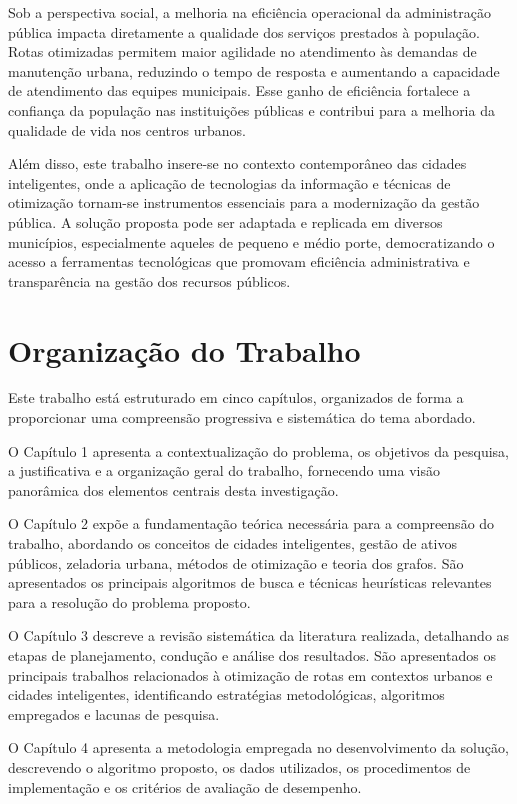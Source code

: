 Sob a perspectiva social, a melhoria na eficiência operacional da administração pública impacta 
diretamente a qualidade dos serviços prestados à população. Rotas otimizadas permitem maior agilidade 
no atendimento às demandas de manutenção urbana, reduzindo o tempo de resposta e aumentando a 
capacidade de atendimento das equipes municipais. Esse ganho de eficiência fortalece a confiança 
da população nas instituições públicas e contribui para a melhoria da qualidade de vida nos centros urbanos.

Além disso, este trabalho insere-se no contexto contemporâneo das cidades inteligentes, 
onde a aplicação de tecnologias da informação e técnicas de otimização tornam-se instrumentos 
essenciais para a modernização da gestão pública. A solução proposta pode ser adaptada
e replicada em diversos municípios, especialmente aqueles de pequeno e médio porte, 
democratizando o acesso a ferramentas tecnológicas que promovam eficiência administrativa 
e transparência na gestão dos recursos públicos.

\section{Organização do Trabalho}

Este trabalho está estruturado em cinco capítulos, organizados de forma a proporcionar uma compreensão 
progressiva e sistemática do tema abordado.

O Capítulo 1 apresenta a contextualização do problema, os objetivos da pesquisa, 
a justificativa e a organização geral do trabalho, fornecendo uma visão panorâmica 
dos elementos centrais desta investigação.

O Capítulo 2 expõe a fundamentação teórica necessária para a compreensão do trabalho,
abordando os conceitos de cidades inteligentes, gestão de ativos públicos, zeladoria 
urbana, métodos de otimização e teoria dos grafos. São apresentados os principais 
algoritmos de busca e técnicas heurísticas relevantes para a resolução do problema proposto.

O Capítulo 3 descreve a revisão sistemática da literatura realizada, detalhando as 
etapas de planejamento, condução e análise dos resultados. São apresentados os principais 
trabalhos relacionados à otimização de rotas em contextos urbanos e cidades inteligentes, identificando estratégias 
metodológicas, algoritmos empregados e lacunas de pesquisa.

O Capítulo 4 apresenta a metodologia empregada no desenvolvimento da solução, descrevendo 
o algoritmo proposto, os dados utilizados, os procedimentos de implementação e os critérios 
de avaliação de desempenho.

